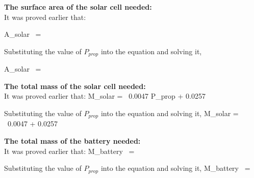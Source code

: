 \p \textbf{The surface area of the solar cell needed:} \vspace{0.1cm}\\
It was proved earlier that:

\mb A_{solar} \ = \  \quad [m^2] \me

Substituting the value of $ P_{prop} $ into the equation and solving it,

\mb A_{solar} \ = \  \quad [m^2] \me
\boxfour

\vspace{1cm}

\p \textbf{The total mass of the solar cell needed:} \vspace{0.1cm}\\
It was proved earlier that:
\mb M_{solar} = \ 0.0047 P_{prop} + 0.0257  \quad [kg] \me

Substituting the value of $ P_{prop} $ into the equation and solving it,
\mb M_{solar} = \ 0.0047  + 0.0257  \quad [kg] \me
\boxfive

\vspace{1cm}

\p \textbf{The total mass of the battery needed:} \vspace{0.1cm}\\
It was proved earlier that:
\mb M_{battery} \ = \  \me

Substituting the value of $ P_{prop} $ into the equation and solving it,
\mb M_{battery} \ = \  \me
\boxsix
